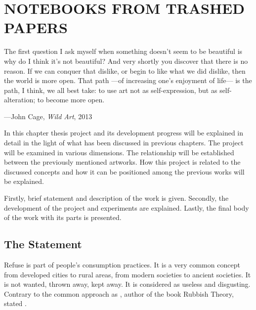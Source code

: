 \chapter{NOTEBOOKS FROM TRASHED PAPERS}




\begin{singlespace}
\epigraph{The first question I ask myself when something doesn't seem to be beautiful is why do I think it's not beautiful? And very shortly you discover that there is no reason. If we can conquer that dislike, or begin to like what we did dislike, then the world is more open. That path ---of increasing one's enjoyment of life--- is the path, I think, we all best take: to use art not as self-expression, but as self-alteration; to become more open.}{\hfill---John Cage, \textit{Wild Art}, 2013}
\end{singlespace}





In this chapter thesis project and its development progress will be explained in detail in the light of what has been discussed in previous chapters. The project will be examined in various dimensions. The relationship will be established between the previously mentioned artworks. How this project is related to the discussed concepts and how it can be positioned among the previous works will be explained.

Firstly, brief statement and description of the work is given. Secondly, the development of the project and experiments are explained. Lastly, the final body of the work with its parts is presented.





%
%
\section{The Statement}
Refuse is part of people’s consumption practices. It is a very common concept from developed cities to rural areas, from modern societies to ancient societies. It is not wanted, thrown away, kept away. It is considered as useless and disgusting. Contrary to the common approach as \cite{thompson1979rubbish}, author of the book Rubbish Theory, stated .

